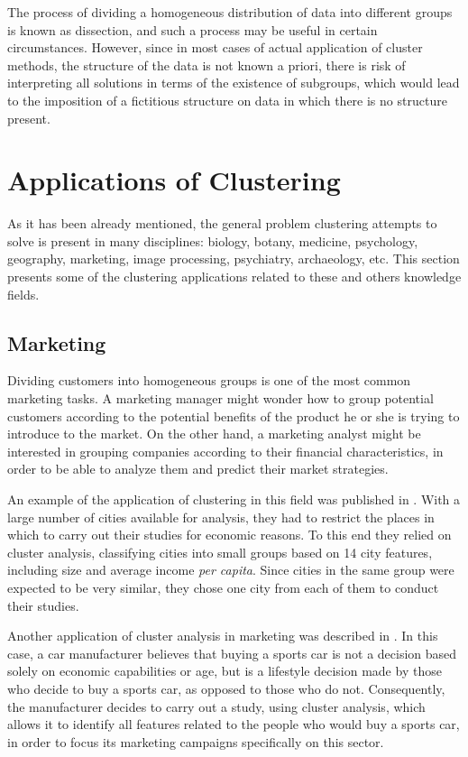 The process of dividing a homogeneous distribution of data into different groups is known as dissection, and such a process may be useful in certain circumstances. However, since in most cases of actual application of cluster methods, the structure of the data is not known a priori, there is risk of interpreting all solutions in terms of the existence of subgroups, which would lead to the imposition of a fictitious structure on data in which there is no structure present.

\section{Applications of Clustering} \label{sec:ClusteringApplications}

As it has been already mentioned, the general problem clustering attempts to solve is present in many disciplines: biology, botany, medicine, psychology, geography, marketing, image processing, psychiatry, archaeology, etc. This section presents some of the clustering applications related to these and others knowledge fields.

\subsection{Marketing}

Dividing customers into homogeneous groups is one of the most common marketing tasks. A marketing manager might wonder how to group potential customers according to the potential benefits of the product he or she is trying to introduce to the market. On the other hand, a marketing analyst might be interested in grouping companies according to their financial characteristics, in order to be able to analyze them and predict their market strategies.

An example of the application of clustering in this field was published in \cite{green1967cluster}. With a large number of cities available for analysis, they had to restrict the places in which to carry out their studies for economic reasons. To this end they relied on cluster analysis, classifying cities into small groups based on 14 city features, including size and average income \textit{per capita}. Since cities in the same group were expected to be very similar, they chose one city from each of them to conduct their studies.

Another application of cluster analysis in marketing was described in \cite{chakrapani2004statistics}. In this case, a car manufacturer believes that buying a sports car is not a decision based solely on economic capabilities or age, but is a lifestyle decision made by those who decide to buy a sports car, as opposed to those who do not. Consequently, the manufacturer decides to carry out a study, using cluster analysis, which allows it to identify all features related to the people who would buy a sports car, in order to focus its marketing campaigns specifically on this sector.

